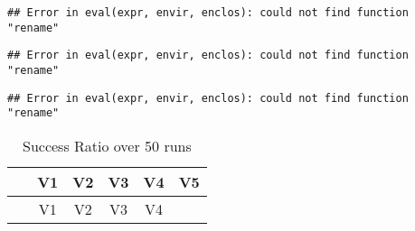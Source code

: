 \documentclass[12pt,a4paper]{article}
\begin{document}
\begin{verbatim}
## Error in eval(expr, envir, enclos): could not find function "rename"
\end{verbatim}

\begin{verbatim}
## Error in eval(expr, envir, enclos): could not find function "rename"
\end{verbatim}

\begin{verbatim}
## Error in eval(expr, envir, enclos): could not find function "rename"
\end{verbatim}

\begin{longtable}[c]{@{}cccccc@{}}
\caption{Success Ratio over 50 runs}\tabularnewline
\toprule
\begin{minipage}[b]{0.12\columnwidth}\centering\strut
~
\strut\end{minipage} &
\begin{minipage}[b]{0.06\columnwidth}\centering\strut
V1
\strut\end{minipage} &
\begin{minipage}[b]{0.06\columnwidth}\centering\strut
V2
\strut\end{minipage} &
\begin{minipage}[b]{0.06\columnwidth}\centering\strut
V3
\strut\end{minipage} &
\begin{minipage}[b]{0.06\columnwidth}\centering\strut
V4
\strut\end{minipage} &
\begin{minipage}[b]{0.06\columnwidth}\centering\strut
V5
\strut\end{minipage}\tabularnewline
\midrule
\endfirsthead
\toprule
\begin{minipage}[b]{0.12\columnwidth}\centering\strut
~
\strut\end{minipage} &
\begin{minipage}[b]{0.06\columnwidth}\centering\strut
V1
\strut\end{minipage} &
\begin{minipage}[b]{0.06\columnwidth}\centering\strut
V2
\strut\end{minipage} &
\begin{minipage}[b]{0.06\columnwidth}\centering\strut
V3
\strut\end{minipage} &
\begin{minipage}[b]{0.06\columnwidth}\centering\strut
V4
\strut\end{minipage} &

\end{longtable}
\end{document}

